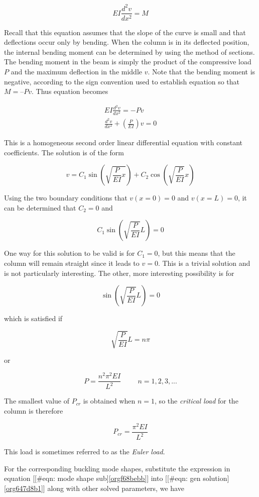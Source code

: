 \documentclass[a4paper,openany,12pt]{book}
\begin{document}
{{$$EI\frac{d^2v}{dx^2} = M$$

Recall that this equation assumes that the slope of the curve is small
and that deflections occur only by bending. When the column is in its
deflected position, the internal bending moment can be determined by
using the method of sections. The bending moment in the beam is simply
the product of the compressive load \(P\) and the maximum deflection in
the middle \(v\). Note that the bending moment is negative, according to
the sign convention used to establish equation so that \(M = –Pv\). Thus
equation becomes


$$\begin{gathered}
    EI\frac{d^2v}{dx^2} =  - Pv \\
    \frac{d^2v}{dx^2} + \left( \frac{P}{EI} \right)v = 0 
  \end{gathered}$$

This is a homogeneous second order linear differential equation with
constant coefficients. The solution is of the form

$$ v = C_1\sin \left( \sqrt {\frac{P}{EI} x} \right) + C_2\cos \left( \sqrt {\frac{P}{EI}} x \right)$$

Using the two boundary conditions that \(v(x = 0) = 0\) and
\(v(x = L) = 0\), it can be determined that \(C_2 = 0\) and

$$C_1\sin \left( \sqrt {\frac{P}{EI}} L \right) = 0$$

One way for this solution to be valid is for \(C_1 = 0\), but this means
that the column will remain straight since it leads to \(v = 0\). This is
a trivial solution and is not particularly interesting. The other, more
interesting possibility is for

$$\sin \left( \sqrt {\frac{P}{EI}} L \right) = 0$$

which is satisfied if

$$ \sqrt {\frac{P}{EI}} L = n\pi$$

or

$$P = \frac{n^2\pi^2EI}{L^2} \hspace{1cm}n = 1,2,3,...$$

The smallest value of \(P_{cr}\) is obtained when \(n = 1\), so the
\emph{critical load} for the column is therefore

$$P_{cr} = \frac{\pi ^2EI}{L^2}$$

This load is sometimes referred to as the \emph{Euler load}.

For the corresponding buckling mode shapes, substitute the expression in
equation [[\#eqn: mode shape sub]\ref{orgf68bebb}] into
[[\#eqn: gen solution]\ref{org647d8b1}] along with other solved
parameters, we have

}}
\end{document}
